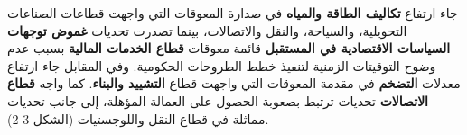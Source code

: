 جاء ارتفاع \textbf{تكاليف الطاقة والمياه} في صدارة المعوقات التي واجهت قطاعات الصناعات التحويلية، والسياحة، والنقل والاتصالات، بينما تصدرت تحديات \textbf{غموض توجهات السياسات الاقتصادية في المستقبل} قائمة معوقات \textbf{قطاع الخدمات المالية} بسبب عدم وضوح التوقيتات الزمنية لتنفيذ خطط الطروحات الحكومية. وفي المقابل جاء ارتفاع معدلات \textbf{التضخم} في مقدمة المعوقات التي واجهت قطاع \textbf{التشييد والبناء}. كما واجه \textbf{قطاع الاتصالات} تحديات ترتبط بصعوبة الحصول على العمالة المؤهلة، إلى جانب تحديات مماثلة في قطاع النقل واللوجستيات (الشكل 3-2).
